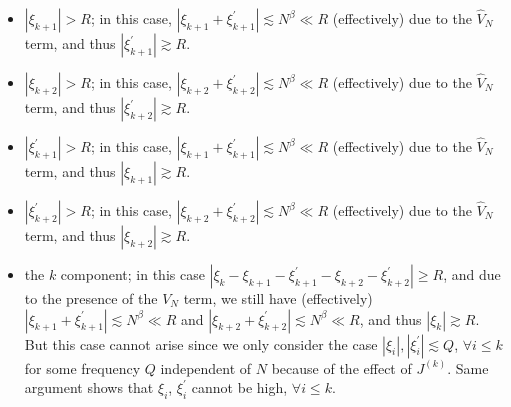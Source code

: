 \documentclass[12pt,letterpaper,leqno]{amsart}
\theoremstyle{plain}
\numberwithin{equation}{section}
\numberwithin{theorem}{section}
\numberwithin{proposition}{section}
\numberwithin{lemma}{section}
\numberwithin{corollary}{section}
\begin{document}
\begin{itemize}
\item $\left\vert \xi _{k+1}\right\vert >R$; in this case, $\left\vert \xi
_{k+1}+\xi _{k+1}^{\prime }\right\vert \lesssim N^{\beta }\ll R$
(effectively) due to the $\hat{V}_{N}$ term, and thus $\left\vert \xi
_{k+1}^{\prime }\right\vert \gtrsim R$.

\item $\left\vert \xi _{k+2}\right\vert >R$; in this case, $\left\vert \xi
_{k+2}+\xi _{k+2}^{\prime }\right\vert \lesssim N^{\beta }\ll R$
(effectively) due to the $\hat{V}_{N}$ term, and thus $\left\vert \xi
_{k+2}^{\prime }\right\vert \gtrsim R$.

\item $\left\vert \xi _{k+1}^{\prime }\right\vert >R$; in this case, $%
\left\vert \xi _{k+1}+\xi _{k+1}^{\prime }\right\vert \lesssim N^{\beta }\ll
R$ (effectively) due to the $\hat{V}_{N}$ term, and thus $\left\vert \xi
_{k+1}\right\vert \gtrsim R$.

\item $\left\vert \xi _{k+2}^{\prime }\right\vert >R$; in this case, $%
\left\vert \xi _{k+2}+\xi _{k+2}^{\prime }\right\vert \lesssim N^{\beta }\ll
R$ (effectively) due to the $\hat{V}_{N}$ term, and thus $\left\vert \xi
_{k+2}\right\vert \gtrsim R$.

\item the $k$ component; in this case $\left\vert \xi _{k}-\xi _{k+1}-\xi
_{k+1}^{\prime }-\xi _{k+2}-\xi _{k+2}^{\prime }\right\vert \geqslant R$,
and due to the presence of the $V_{N}$ term, we still have (effectively) $%
\left\vert \xi _{k+1}+\xi _{k+1}^{\prime }\right\vert \lesssim N^{\beta }\ll
R$ and $\left\vert \xi _{k+2}+\xi _{k+2}^{\prime }\right\vert \lesssim
N^{\beta }\ll R$, and thus $\left\vert \xi _{k}\right\vert \gtrsim R$. But
this case cannot arise since we only consider the case $\left\vert \xi
_{i}\right\vert ,\left\vert \xi _{i}^{\prime }\right\vert \lesssim Q$, $%
\forall i\leqslant k$ for some frequency $Q$ independent of $N$ because of
the effect of $J^{(k)}$. Same argument shows that $\xi _{i}$, $\xi
_{i}^{\prime }$ cannot be high, $\forall i\leqslant k$.
\end{itemize}
\end{document}
